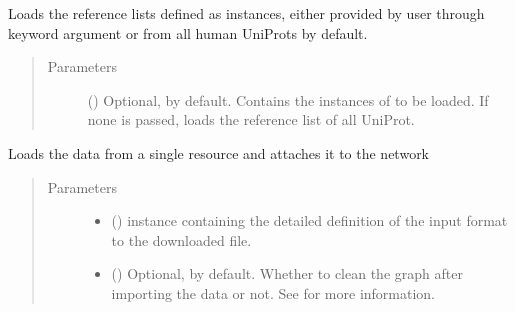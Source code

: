 \documentclass[letterpaper,10pt,english]{sphinxmanual}
\begin{document}
\begin{fulllineitems}
\begin{fulllineitems}
\label{\detokenize{main:pypath.main.PyPath.load_reflists}}
Loads the reference lists defined as
 instances, either
provided by user through keyword argument  or from
all human UniProts by default.
\begin{quote}\begin{description}
\item[{Parameters}] \leavevmode
{} () \textendash{} Optional,  by default. Contains the instances of
 to be loaded. If
none is passed, loads the reference list of all UniProt.

\end{description}\end{quote}

\end{fulllineitems}


\begin{fulllineitems}
\label{\detokenize{main:pypath.main.PyPath.load_resource}}
Loads the data from a single resource and attaches it to the
network
\begin{quote}\begin{description}
\item[{Parameters}] \leavevmode\begin{itemize}
\item {} 
 () \textendash{}  instance
containing the detailed definition of the input format to
the downloaded file.

\item {} 
 () \textendash{} Optional,  by default. Whether to clean the graph
after importing the data or not. See
{\hyperref[\detokenize{main:pypath.main.PyPath.clean_graph}]{}} for more
information.


\end{itemize}
\end{description}
\end{quote}
\end{fulllineitems}
\end{fulllineitems}
\end{document}
